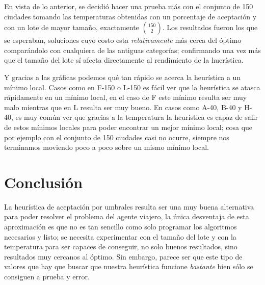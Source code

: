 \documentclass{article}
\newcommand{\tit}[1]{\textit{#1}}
\begin{document}
  En vista de lo anterior, se decidió hacer una prueba más 
  con el conjunto de 150 ciudades tomando las temperaturas 
  obtenidas con un porcentaje de aceptación y con un lote 
  de mayor tamaño, exactamente $\binom{150}{2}$. Los 
  resultados fueron los que se esperaban, soluciones
  cuyo costo esta \tit{relativamente} más cerca del 
  óptimo comparándolo con cualquiera de las antiguas 
  categorías; confirmando una vez más que el tamaño 
  del lote sí afecta directamente al rendimiento de la 
  huerística.

  Y gracias a las gráficas podemos qué tan rápido se 
  acerca la heurística a un mínimo local. Casos como en 
  F-150 o L-150 es fácil ver que la heurística se 
  atasca rápidamente en un mínimo local, en el caso de 
  F este mínimo resulta ser muy malo mientras que en L
  resulta ser muy bueno. En casos como A-40, B-40 y
  H-40, es muy común ver que gracias a la temperatura 
  la heurística es capaz de salir de estos mínimos locales
  para poder encontrar un mejor mínimo local; cosa que 
  por ejemplo con el conjunto de 150 ciudades casi no ocurre,
  siempre nos terminamos moviendo poco a poco sobre un 
  mismo mínimo local.

  \section{Conclusión} \label{conclusion}
  La heurística de aceptación por umbrales resulta ser 
  una muy buena alternativa para poder resolver 
  el problema del agente viajero, la única desventaja 
  de esta aproximación es que no es tan sencillo como 
  solo programar los algoritmos necesarios y listo; 
  se necesita experimentar con el tamaño del lote y con 
  la temperatura para ser capaces de conseguir, no 
  solo buenos resultados, sino resultados muy cercanos 
  al óptimo. Sin embargo, parece ser que este tipo 
  de valores que hay que buscar que nuestra heurística 
  funcione \tit{bastante} bien sólo se consiguen 
  a prueba y error.
\end{document}
